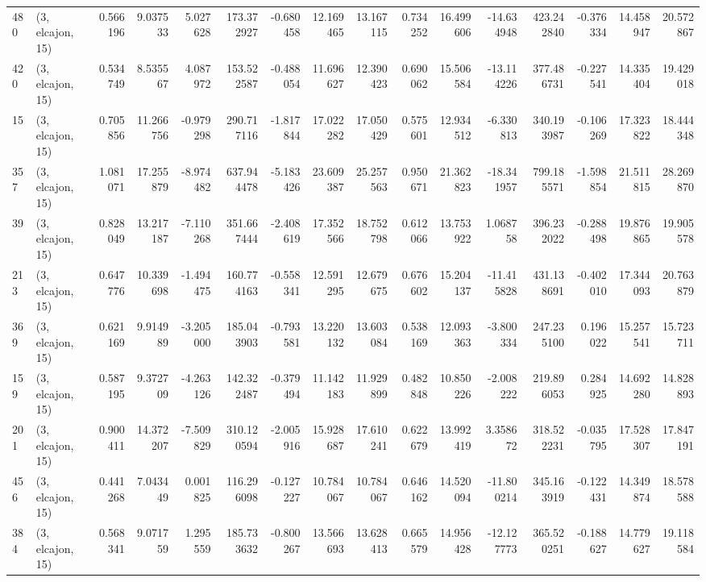 \begin{tabular}{llrrrrrrrrrrrrrr}
480 &  (3, elcajon, 15) &   0.566196 &   9.037533 &   5.027628 &   173.372927 &  -0.680458 &  12.169465 &  13.167115 &  0.734252 &  16.499606 & -14.634948 &   423.242840 & -0.376334 &  14.458947 &  20.572867 \\
420 &  (3, elcajon, 15) &   0.534749 &   8.535567 &   4.087972 &   153.522587 &  -0.488054 &  11.696627 &  12.390423 &  0.690062 &  15.506584 & -13.114226 &   377.486731 & -0.227541 &  14.335404 &  19.429018 \\
15  &  (3, elcajon, 15) &   0.705856 &  11.266756 &  -0.979298 &   290.717116 &  -1.817844 &  17.022282 &  17.050429 &  0.575601 &  12.934512 &  -6.330813 &   340.193987 & -0.106269 &  17.323822 &  18.444348 \\
357 &  (3, elcajon, 15) &   1.081071 &  17.255879 &  -8.974482 &   637.944478 &  -5.183426 &  23.609387 &  25.257563 &  0.950671 &  21.362823 & -18.341957 &   799.185571 & -1.598854 &  21.511815 &  28.269870 \\
39  &  (3, elcajon, 15) &   0.828049 &  13.217187 &  -7.110268 &   351.667444 &  -2.408619 &  17.352566 &  18.752798 &  0.612066 &  13.753922 &   1.068758 &   396.232022 & -0.288498 &  19.876865 &  19.905578 \\
213 &  (3, elcajon, 15) &   0.647776 &  10.339698 &  -1.494475 &   160.774163 &  -0.558341 &  12.591295 &  12.679675 &  0.676602 &  15.204137 & -11.415828 &   431.138691 & -0.402010 &  17.344093 &  20.763879 \\
369 &  (3, elcajon, 15) &   0.621169 &   9.914989 &  -3.205000 &   185.043903 &  -0.793581 &  13.220132 &  13.603084 &  0.538169 &  12.093363 &  -3.800334 &   247.235100 &  0.196022 &  15.257541 &  15.723711 \\
159 &  (3, elcajon, 15) &   0.587195 &   9.372709 &  -4.263126 &   142.322487 &  -0.379494 &  11.142183 &  11.929899 &  0.482848 &  10.850226 &  -2.008222 &   219.896053 &  0.284925 &  14.692280 &  14.828893 \\
201 &  (3, elcajon, 15) &   0.900411 &  14.372207 &  -7.509829 &   310.120594 &  -2.005916 &  15.928687 &  17.610241 &  0.622679 &  13.992419 &   3.358672 &   318.522231 & -0.035795 &  17.528307 &  17.847191 \\
456 &  (3, elcajon, 15) &   0.441268 &   7.043449 &   0.001825 &   116.296098 &  -0.127227 &  10.784067 &  10.784067 &  0.646162 &  14.520094 & -11.800214 &   345.163919 & -0.122431 &  14.349874 &  18.578588 \\
384 &  (3, elcajon, 15) &   0.568341 &   9.071759 &   1.295559 &   185.733632 &  -0.800267 &  13.566693 &  13.628413 &  0.665579 &  14.956428 & -12.127773 &   365.520251 & -0.188627 &  14.779627 &  19.118584 \\

\end{tabular}
